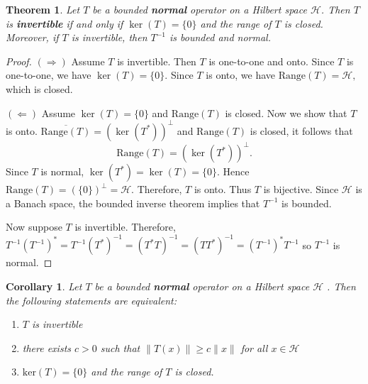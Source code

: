 \documentclass{report}
\newtheorem{thm}{Theorem}
\newtheorem{cor}{Corollary}
\begin{document}
\begin{thm}
Let $T$ be a bounded \textbf{normal} operator on a Hilbert space $\mathcal{H}$. Then $T$ is \textbf{invertible} if and only if $\ker(T)=\{0\}$ and the range of $T$ is closed. Moreover, if $T$ is invertible, then $T^{-1}$ is bounded and normal.
\end{thm}
\begin{proof}
$(\Rightarrow)$ Assume $T$ is invertible. Then $T$ is one-to-one and onto. Since $T$ is one-to-one, we have
$
\ker(T)=\{0\}.
$
Since $T$ is onto, we have
$
\mathrm{Range}(T)=\mathcal{H},
$
which is closed.

$(\Leftarrow)$ Assume $\ker(T)=\{0\}$ and $\mathrm{Range}(T)$ is closed. Now we show that $T$ is onto.
$
\overline{\mathrm{Range}(T)}=(\ker(T^*))^\perp
$
and $\mathrm{Range}(T)$ is closed, it follows that
\[
\mathrm{Range}(T)=(\ker(T^*))^\perp.
\]
Since $T$ is normal,
$
\ker(T^*)=\ker(T)=\{0\}.
$
Hence
$
\mathrm{Range}(T)=(\{0\})^\perp=\mathcal{H}.
$
Therefore, $T$ is onto. Thus $T$ is bijective. Since $\mathcal{H}$ is a Banach space, the bounded inverse theorem implies that $T^{-1}$ is bounded.

Now suppose $T$ is invertible. Therefore,$
T^{-1}(T^{-1})^*=T^{-1}(T^*)^{-1}=(T^*T)^{-1}
=(TT^*)^{-1}=(T^{-1})^{*}T^{-1}$ so $T^{-1}$ is normal.
\end{proof}

\begin{cor}
 Let $T$ be a bounded \textbf{normal} operator on a Hilbert space $\mathcal{H}$ . Then the following statements are equivalent:
 \begin{enumerate}
     \item $T$ is invertible 
     \item there exists $c>0$ such that $\|T(x)\|\ge c \|x\|$ for all $x \in \mathcal{H}$
     \item $\mathrm{ker}(T)=\{0 \}$ and the range of $T$ is closed.\end{enumerate}
\end{cor}
\end{document}
